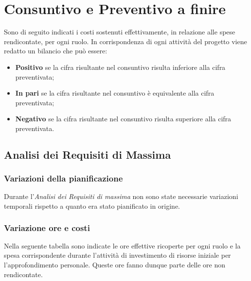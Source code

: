 \section{Consuntivo e Preventivo a finire}
Sono di seguito indicati i costi sostenuti effettivamente, in relazione alle spese rendicontate, per ogni ruolo.
In corrispondenza di ogni attività del progetto viene redatto un bilancio che può essere:
\begin{itemize}
	\item \textbf{Positivo} se la cifra risultante nel consuntivo risulta inferiore alla cifra preventivata;
	\item \textbf{In pari} se la cifra risultante nel consuntivo è equivalente alla cifra preventivata;	
	\item \textbf{Negativo} se la cifra risultante nel consuntivo risulta superiore alla cifra preventivata.
\end{itemize}
	\subsection{Analisi dei Requisiti di Massima}
		\subsubsection{Variazioni della pianificazione}
		Durante l'\textit{Analisi dei Requisiti di massima} non sono state necessarie variazioni temporali rispetto a quanto era stato pianificato in origine.
		\subsubsection{Variazione ore e costi}
		Nella seguente tabella sono indicate le ore effettive ricoperte per ogni ruolo e la spesa corrispondente durante l'attività di investimento di risorse iniziale per l'approfondimento personale. Queste ore fanno dunque parte delle ore non rendicontate.
		
